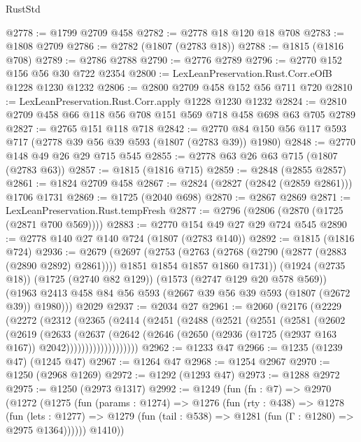 \begin{lexlean}{RustStd}
\begin{coremodule}
{\begin{coremodule}
{{{{{{{{{{{{{@2778 := @1799 @2709 @458
@2782 := @2778 @18 @120 @18 @708
@2783 := @1808 @2709
@2786 := @2782 (@1807 (@2783 @18))
@2788 := @1815 (@1816 @708)
@2789 := @2786 @2788
@2790 := @2776 @2789
@2796 := @2770 @152 @156 @56 @30 @722 @2354
@2800 := LexLeanPreservation.Rust.Corr.eOfB @1228 @1230 @1232
@2806 := @2800 @2709 @458 @152 @56 @711 @720
@2810 := LexLeanPreservation.Rust.Corr.apply @1228 @1230 @1232
@2824 := @2810 @2709 @458 @66 @118 @56 @708 @151 @569 @718 @458 @698 @63 @705 @2789
@2827 := @2765 @151 @118 @718
@2842 := @2770 @84 @150 @56 @117 @593 @717 (@2778 @39 @56 @39 @593 (@1807 (@2783 @39)) @1980)
@2848 := @2770 @148 @49 @26 @29 @715 @545
@2855 := @2778 @63 @26 @63 @715 (@1807 (@2783 @63))
@2857 := @1815 (@1816 @715)
@2859 := @2848 (@2855 @2857)
@2861 := @1824 @2709 @458
@2867 := @2824 (@2827 (@2842 (@2859 @2861))) @1706 @1731
@2869 := @1725 (@2040 @698)
@2870 := @2867 @2869
@2871 := LexLeanPreservation.Rust.tempFresh
@2877 := @2796 (@2806 (@2870 (@1725 (@2871 @700 @569))))
@2883 := @2770 @154 @49 @27 @29 @724 @545
@2890 := @2778 @140 @27 @140 @724 (@1807 (@2783 @140))
@2892 := @1815 (@1816 @724)
@2936 := @2679
    (@2697
      (@2753
        (@2763 (@2768 (@2790 (@2877 (@2883 (@2890 @2892) @2861)))) @1851 @1854 @1857 @1860 @1731))
      (@1924 (@2735 @18))
      (@1725 (@2740 @82 @129))
      (@1573 (@2747 @129 @20 @578 @569))
      (@1963 @2413 @458 @84 @56 @593 (@2667 @39 @56 @39 @593 (@1807 (@2672 @39)) @1980)))
    @2029
@2937 := @2034 @27
@2961 := @2060
    (@2176
      (@2229
        (@2272
          (@2312
            (@2365
              (@2414
                (@2451
                  (@2488
                    (@2521
                      (@2551
                        (@2581
                          (@2602
                            (@2619
                              (@2633
                                (@2637
                                  (@2642
                                    (@2646
                                      (@2650
                                        (@2936 (@1725 (@2937 @163 @167)) @2042)))))))))))))))))))
@2962 := @1233 @47
@2966 := @1235 (@1239 @47) (@1245 @47)
@2967 := @1264 @47
@2968 := @1254 @2967
@2970 := @1250 (@2968 @1269)
@2972 := @1292 (@1293 @47)
@2973 := @1288 @2972
@2975 := @1250 (@2973 @1317)
@2992 := @1249
    (fun (fn : @7) =>
    @2970
      (@1272
        (@1275
          (fun (params : @1274) =>
          @1276
            (fun (rty : @438) =>
            @1278
              (fun (lets : @1277) =>
              @1279 (fun (tail : @538) => @1281 (fun (Γ : @1280) => @2975 @1364))))))
        @1410))
}}}}}}}}}}}}}
\end{coremodule}}
\end{coremodule}
\end{lexlean}
